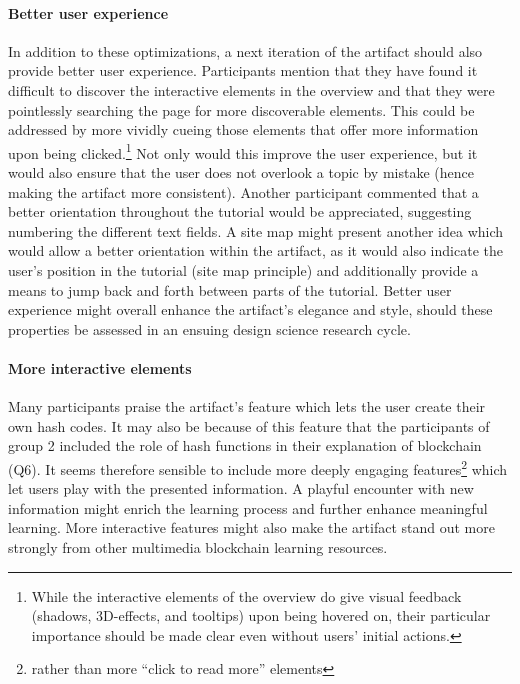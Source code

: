 \paragraph{Better user experience} In addition to these optimizations, a next iteration of the artifact should also provide better user experience. Participants mention that they have found it difficult to discover the interactive elements in the overview and that they were pointlessly searching the page for more discoverable elements. This could be addressed by more vividly cueing those elements that offer more information upon being clicked.\footnote{While the interactive elements of the overview do give visual feedback (shadows, 3D-effects, and tooltips) upon being hovered on, their particular importance should be made clear even without users' initial actions.} Not only would this improve the user experience, but it would also ensure that the user does not overlook a topic by mistake (hence making the artifact more consistent). Another participant commented that a better orientation throughout the tutorial would be appreciated, suggesting numbering the different text fields. A site map might present another idea which would allow a better orientation within the artifact, as it would also indicate the user's position in the tutorial (site map principle) and additionally provide a means to jump back and forth between parts of the tutorial. Better user experience might overall enhance the artifact's elegance and style, should these properties be assessed in an ensuing design science research cycle. 

\paragraph{More interactive elements} Many participants praise the artifact's feature which lets the user create their own hash codes. It may also be because of this feature that the participants of group 2 included the role of hash functions in their explanation of blockchain (Q6). It seems therefore sensible to include more deeply engaging features\footnote{rather than more \enquote{click to read more} elements} which let users play with the presented information. A playful encounter with new information might enrich the learning process and further enhance meaningful learning. More interactive features might also make the artifact stand out more strongly from other multimedia blockchain learning resources. 


